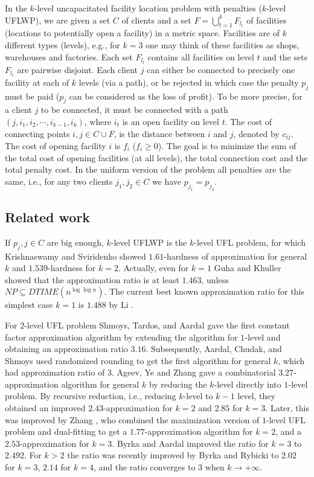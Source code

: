\documentclass{llncs}
\begin{document}
In the $k$-level uncapacitated facility location problem with penalties ($k$-level UFLWP), we are given a set $C$ of clients and a set $F = \bigcup_{t = 1}^{k} F_{l_t}$ of facilities (locations to potentially open a facility) in a metric space. Facilities are of $k$ different types (levels), e.g., for $k=3$ one may think of these facilities as shops, warehouses and factories.
Each set $F_{l_t}$ contains all facilities on level $t$ and the sets $F_{l_t}$ are pairwise disjoint.
Each client $j$ can either be connected to precisely one facility at each of $k$ levels (via a path), or be rejected in which case the penalty $p_j$ must be paid ($p_j$ can be considered as the loss of profit).
To be more precise, for a client $j$ to be connected, it must be connected with a path $(j,i_{1}, i_{2}, \cdots, i_{k-1}, i_{k})$, where $i_t$ is an open facility on level $t$.
The cost of connecting points $i,j \in C \cup F$, is the distance between $i$ and $j$, denoted by $c_{ij}$. The cost of opening facility $i$ is $f_{i}$ ($f_{i}\geq 0$).
The goal is to minimize the sum of the total cost of opening facilities (at all levels), the total connection cost and the total penalty cost.
In the uniform version of the problem all penalties are the same, i.e., for any two clients $j_1,j_2 \in C$ we have $p_{j_1} = p_{j_2}$.

\subsection{Related work}

If $p_j, j\in C$ are big enough, $k$-level UFLWP is the $k$-level UFL problem, for which Krishnaswamy and Sviridenko \cite{Krishnaswamy} showed
$1.61$-hardness of approximation for general $k$ and $1.539$-hardness for $k=2$. Actually, even for $k=1$ Guha and Khuller \cite{Guha} showed that the approximation ratio is at least $1.463$, unless $NP\subseteq DTIME(n^{\log\log n})$. The current best known approximation ratio for this simplest case $k=1$ is $1.488$ by Li \cite{ShiLi}.

For $2$-level UFL problem Shmoys, Tardos, and Aardal \cite{shmoys_stoc97} gave the first constant factor approximation algorithm by extending the algorithm for $1$-level and obtaining an approximation ratio $3.16$. Subsequently, Aardal, Chudak, and Shmoys \cite{Aardal} used randomized rounding to get the first algorithm for general $k$, which had approximation ratio of $3$.
Ageev, Ye and Zhang \cite{Ageev} gave a combinatorial $3.27$-approximation algorithm for general $k$ by reducing the $k$-level directly into $1$-level problem. By recursive reduction, i.e., reducing $k$-level to $k-1$ level, they obtained an improved $2.43$-approximation for $k=2$ and $2.85$ for $k=3$. Later, this was improved by Zhang \cite{Zhang}, who combined the maximization version of $1$-level UFL problem and dual-fitting to get a $1.77$-approximation algorithm for $k=2$, and a $2.53$-approximation for $k=3$.
Byrka and Aardal \cite{Byrka} improved the ratio for $k=3$ to $2.492$.
For $k>2$ the ratio was recently improved by Byrka and Rybicki \cite{Rybicki} to $2.02$ for $k=3$, $2.14$ for $k=4$, and the ratio converges to 3 when $k\rightarrow + \infty$.
\end{document}
